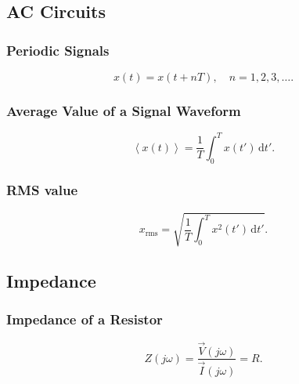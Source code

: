 
\subsection{AC Circuits}

\subsubsection{Periodic Signals}
\begin{equation*}
  x(t) = x(t + nT), \quad n = 1,2,3,\ldots 
.\end{equation*}

\begin{symbols}
\end{symbols}


\subsubsection{Average Value of a Signal Waveform}
\begin{equation*}
  \left\langle x(t) \right\rangle = \frac{1}{T} \int_{0}^{T} x(t') \, \mathrm{d}t'
.\end{equation*}

\begin{symbols}
\end{symbols}

\subsubsection{RMS value}
\begin{equation*}
  x_{\mathrm{rms}} = \sqrt{\frac{1}{T} \int_{0}^{T} x^2 \left( t' \right) \, \mathrm{d}t'}
.\end{equation*}

\begin{symbols}
\end{symbols}

\subsection{Impedance}

\subsubsection{Impedance of a Resistor}
\begin{equation*}
  Z (j \omega) = \frac{\Vec{V}(j \omega)}{\Vec{I} (j \omega)} = R
.\end{equation*}

